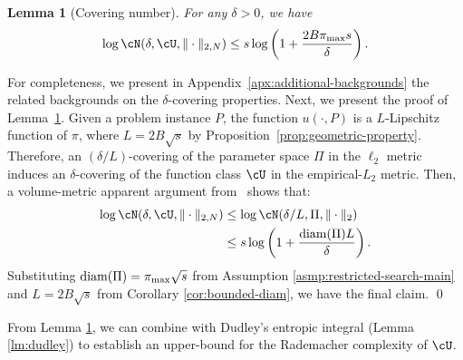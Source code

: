 \documentclass{article}
\theoremstyle{plain}
\newtheorem{lemma}[theorem]{Lemma}
\theoremstyle{definition}
\theoremstyle{remark}
\begin{document}
\begin{lemma} [Covering number] \label{lm:covering-upper-bound}
     For any $\delta > 0$, we have
    \[
        \log \cN(\delta, \cU, \|\cdot\|_{2, N}) \leq s \log \left(1 + \frac{2B\pi_\textup{max}s}{\delta}\right).
    \]
\end{lemma}
For completeness, we present in Appendix~\ref{apx:additional-backgrounds} the related backgrounds on the $\delta$-covering properties. Next, we present the proof of Lemma~\ref{lm:covering-upper-bound}.
     Given a problem instance $P$, the function $u(\cdot, P)$ is a $L$-Lipschitz function of $\pi$, where $L = 2B\sqrt{s}$ by Proposition~\ref{prop:geometric-property}. Therefore, an $(\delta/L)$-covering of the parameter space $\Pi$ in the $\ell_2$ metric induces an $\delta$-covering of the function class $\cU$ in the empirical-$L_2$ metric. Then,  a volume-metric apparent argument from~\citet[Lemma~5.7]{wainwright2019high} shows that: 
     \begin{align*}
        \log \cN(\delta, \cU, \|\cdot\|_{2, N})  &\le \log \cN(\delta/L, \Pi, \|\cdot\|_2) \\
        & \leq s \log \left(1 + \frac{\textup{diam}(\Pi) L}{\delta}\right).
     \end{align*}
     Substituting $\textup{diam}(\Pi) = \pi_\textup{max}\sqrt{s}$ from Assumption \ref{asmp:restricted-search-main} and $L = 2B\sqrt{s}$ from Corollary \ref{cor:bounded-diam}, we have the final claim.
\qed

From Lemma \ref{lm:covering-upper-bound}, we can combine with Dudley's entropic integral (Lemma \ref{lm:dudley}) to establish an upper-bound for the Rademacher complexity of $\cU$.
\end{document}
